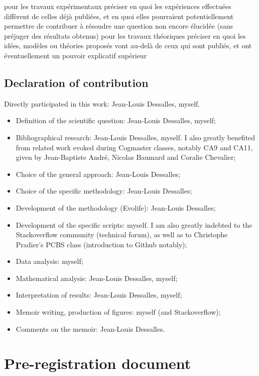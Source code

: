 \documentclass[a4paper,12pt]{report}
\begin{document}
    pour les travaux expérimentaux
        préciser en quoi les expériences effectuées diffèrent de celles déjà publiées, et en quoi elles pourraient potentiellement permettre de contribuer à résoudre une question non encore élucidée (sans préjuger des résultats obtenus)
    pour les travaux théoriques
        préciser en quoi les idées, modèles ou théories proposés vont au-delà de ceux qui sont publiés, et ont éventuellement un pouvoir explicatif supérieur

\chapter*{Declaration of contribution}

Directly participated in this work: Jean-Louis Dessalles, myself.
\begin{itemize}
    \item Definition of the scientific question: Jean-Louis Dessalles, myself;
    \item Bibliographical research: Jean-Louis Dessalles, myself. I also greatly
    benefited from related work evoked during Cogmaster classes, notably CA9 and CA11, given by Jean-Baptiste André,
    Nicolas Baumard and Coralie Chevalier;
    \item Choice of the general approach: Jean-Louis Dessalles;
    \item Choice of the specific methodology: Jean-Louis Dessalles;
    \item Development of the methodology (Evolife): Jean-Louis Dessalles;
    \item Development of the specific scripts: myself. I am also
    greatly indebted to the Stackoverflow community (technical forum),
    as well as to Christophe Pradier's PCBS class (introduction to Github notably);
    \item Data analysis: myself;
    \item Mathematical analysis: Jean-Louis Dessalles, myself;
    \item Interpretation of results: Jean-Louis Dessalles, myself;
    \item Memoir writing, production of figures: myself (and Stackoverflow);
    \item Comments on the memoir: Jean-Louis Dessalles.
\end{itemize}

\part{Pre-registration document}

\end{document}
